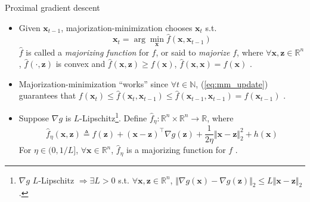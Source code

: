 \documentclass{beamer}
\numberwithin{equation}{section}
\newcommand{\aref}[1]{\alert{\ref{#1}}}
\begin{document}
\begin{frame}{Proximal gradient descent}
    \begin{itemize}
        \item
        Given $ \mathbf{x}_{t - 1} $, majorization-minimization chooses
        $ \mathbf{x}_t $ s.t. \cite{prox_algos}
        \begin{equation} \label{eq:mm_update}
            \mathbf{x}_t = \arg\min_\mathbf{x}\hat{f}(\mathbf{x},
            \mathbf{x}_{t - 1})
        \end{equation}
        $ \hat{f} $ is called a \textit{majorizing function} for $ f $, or
        said to \textit{majorize} $ f $, where $ \forall \mathbf{x},
        \mathbf{z} \in \mathbb{R}^n $, $ \hat{f}(\cdot, \mathbf{z}) $ is
        convex and $ \hat{f}(\mathbf{x}, \mathbf{z}) \ge f(\mathbf{x}) $,
        $ \hat{f}(\mathbf{x}, \mathbf{x}) = f(\mathbf{x}) $ \cite{prox_algos}.

        \item
        Majorization-minimization ``works'' since $ \forall t \in \mathbb{N} $,
        (\aref{eq:mm_update}) guarantees that $ f(\mathbf{x}_t) \le
        \hat{f}(\mathbf{x}_t, \mathbf{x}_{t - 1}) \le
        \hat{f}(\mathbf{x}_{t - 1}, \mathbf{x}_{t - 1}) =
        f(\mathbf{x}_{t - 1}) $ \cite{stat_learn_sparsity}.

        \item
        Suppose $ \nabla g $ is $ L $-Lipschitz\footnote{
            $ \nabla g $ $ L $-Lipschitz $ \Rightarrow \exists L > 0 $ s.t.
            $ \forall \mathbf{x}, \mathbf{z} \in \mathbb{R}^n $,
            $ \Vert\nabla g(\mathbf{x}) - \nabla g(\mathbf{z})\Vert_2 \le
            L\Vert\mathbf{x} - \mathbf{z}\Vert_2 $.
        }. Define $ \hat{f}_\eta : \mathbb{R}^n \times \mathbb{R}^n \rightarrow \mathbb{R} $, where
        \begin{equation} \label{eq:prox_grad_mm_func}
            \hat{f}_\eta(\mathbf{x}, \mathbf{z}) \triangleq f(\mathbf{z}) +
            (\mathbf{x} - \mathbf{z})^\top\nabla g(\mathbf{z}) +
            \frac{1}{2\eta}\Vert\mathbf{x} - \mathbf{z}\Vert_2^2 +
            h(\mathbf{x})
        \end{equation}
        For $ \eta \in (0, 1 / L] $, $ \forall \mathbf{x} \in \mathbb{R}^n $,
        $ \hat{f}_\eta $ is a majorizing function for $ f $ \cite{prox_algos}.
    \end{itemize}

    \medskip
\end{frame}
\end{document}
